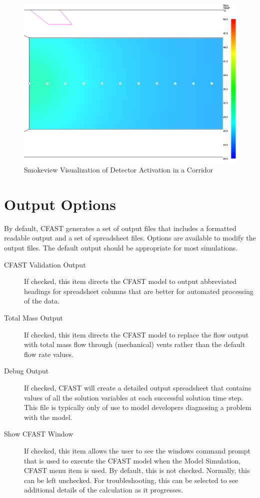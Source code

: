 \begin{figure}[h!]
\begin{center}
\includegraphics[width=6.5in]{FIGURES/SMV_Detectors}
\caption{Smokeview Visualization of Detector Activation in a Corridor}
\end{center}
\end{figure}

\section{Output Options}

By default, CFAST generates a set of output files that includes a formatted readable output and a set of spreadsheet files.  Options are available to modify the output files.  The default output should be appropriate for most simulations.

\begin{description}
    \item[CFAST Validation Output] If checked, this item directs the CFAST model to output abbreviated headings for spreadsheet columns that are better for automated processing of the data.
    \item[Total Mass Output] If checked, this item directs the CFAST model to replace the flow output with total mass flow through (mechanical) vents rather than the default flow rate values.
    \item[Debug Output] If checked, CFAST will create a detailed output spreadsheet that contains values of all the solution variables at each successful solution time step. This file is typically only of use to model developers diagnosing a problem with the model.
    \item[Show CFAST Window] If checked, this item allows the user to see the windows command prompt that is used to execute the CFAST model when the Model Simulation, CFAST menu item is used.  By default, this is not checked.  Normally, this can be left unchecked.  For troubleshooting, this can be selected to see additional details of the calculation as it progresses.
\end{description}


